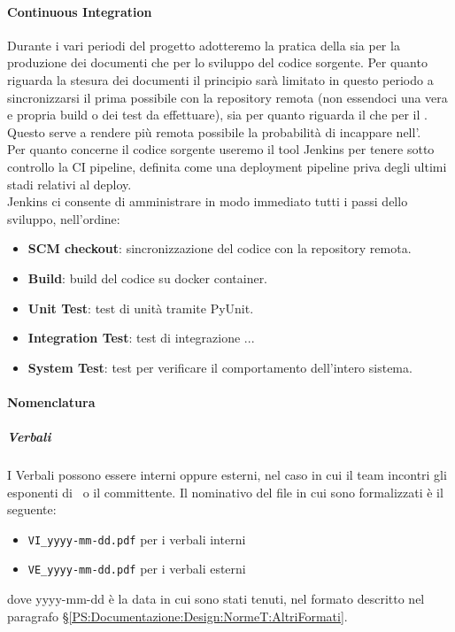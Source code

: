 
			\paragraph{Continuous Integration} %
			Durante i vari periodi del progetto adotteremo la pratica della  sia per la produzione dei documenti che per lo sviluppo del codice sorgente.
			Per quanto riguarda la stesura dei documenti il principio sarà limitato in questo periodo a sincronizzarsi il prima possibile con la repository remota (non essendoci una vera e propria build o dei test da effettuare), sia per quanto riguarda il  che per il .
			Questo serve a rendere più remota possibile la probabilità di incappare nell'.\\
			Per quanto concerne il codice sorgente useremo il tool Jenkins per tenere sotto controllo la CI pipeline, definita come una deployment pipeline priva degli ultimi stadi relativi al deploy.\\
			Jenkins ci consente di amministrare in modo immediato tutti i passi dello sviluppo, nell'ordine:
			\begin{itemize}
			    \item \textbf{SCM checkout}: sincronizzazione del codice con la repository remota.
			    \item \textbf{Build}: build del codice su docker container.
			    \item \textbf{Unit Test}: test di unità tramite PyUnit.
			    \item \textbf{Integration Test}: test di integrazione ... %
			    \item \textbf{System Test}: test per verificare il comportamento dell'intero sistema. 
			\end{itemize}


			\paragraph{Nomenclatura}

			\subparagraph{Verbali}	\label{NomenclaturaVerbali}
			I Verbali  possono essere interni oppure esterni, nel caso in cui il team incontri gli esponenti di \II\ o il committente.
			Il nominativo del file in cui sono formalizzati è il seguente:
			\begin{itemize}
				\item \texttt{VI\_yyyy-mm-dd.pdf} per i verbali interni
				\item \texttt{VE\_yyyy-mm-dd.pdf} per i verbali esterni
			\end{itemize}
			dove yyyy-mm-dd è la data in cui sono stati tenuti, nel formato descritto nel paragrafo \S\ref{PS:Documentazione:Design:NormeT:AltriFormati}.

